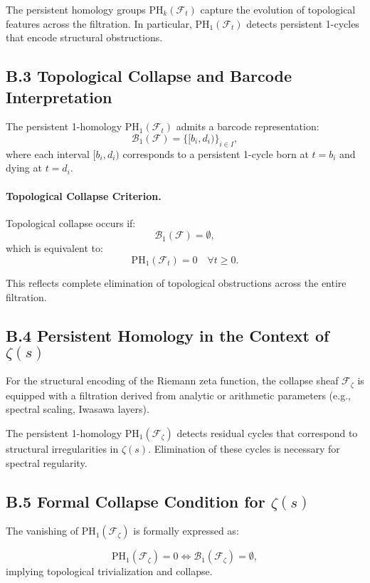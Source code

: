 \documentclass[11pt]{article}
\begin{document}
The persistent homology groups $\mathrm{PH}_k(\mathcal{F}_t)$ capture the evolution of topological features across the filtration. In particular, $\mathrm{PH}_1(\mathcal{F}_t)$ detects persistent 1-cycles that encode structural obstructions.

\subsection*{B.3 Topological Collapse and Barcode Interpretation}

The persistent 1-homology $\mathrm{PH}_1(\mathcal{F}_t)$ admits a barcode representation:
\[
\mathcal{B}_1(\mathcal{F}) = \{ [b_i, d_i) \}_{i \in I},
\]
where each interval $[b_i, d_i)$ corresponds to a persistent 1-cycle born at $t = b_i$ and dying at $t = d_i$.

\paragraph{Topological Collapse Criterion.}  
Topological collapse occurs if:
\[
\mathcal{B}_1(\mathcal{F}) = \emptyset,
\]
which is equivalent to:
\[
\mathrm{PH}_1(\mathcal{F}_t) = 0 \quad \forall t \geq 0.
\]

This reflects complete elimination of topological obstructions across the entire filtration.

\subsection*{B.4 Persistent Homology in the Context of $\zeta(s)$}

For the structural encoding of the Riemann zeta function, the collapse sheaf $\mathcal{F}_{\zeta}$ is equipped with a filtration derived from analytic or arithmetic parameters (e.g., spectral scaling, Iwasawa layers).

The persistent 1-homology $\mathrm{PH}_1(\mathcal{F}_{\zeta})$ detects residual cycles that correspond to structural irregularities in $\zeta(s)$. Elimination of these cycles is necessary for spectral regularity.

\subsection*{B.5 Formal Collapse Condition for $\zeta(s)$}

The vanishing of $\mathrm{PH}_1(\mathcal{F}_{\zeta})$ is formally expressed as:

\[
\mathrm{PH}_1(\mathcal{F}_{\zeta}) = 0 \iff \mathcal{B}_1(\mathcal{F}_{\zeta}) = \emptyset,
\]
implying topological trivialization and collapse.
\end{document}
